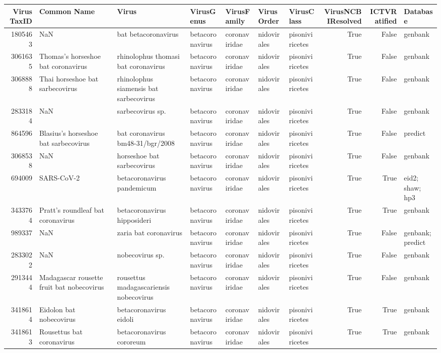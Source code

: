 \begin{tabular}{rllllllrrl}
\toprule
VirusTaxID & Common Name & Virus & VirusGenus & VirusFamily & VirusOrder & VirusClass & VirusNCBIResolved & ICTVRatified & Database \\
\midrule
1805463 & NaN & bat betacoronavirus & betacoronavirus & coronaviridae & nidovirales & pisoniviricetes & True & False & genbank \\
3061635 & Thomas's horseshoe bat coronavirus & rhinolophus thomasi bat coronavirus & betacoronavirus & coronaviridae & nidovirales & pisoniviricetes & True & False & genbank \\
3068888 & Thai horseshoe bat sarbecovirus & rhinolophus siamensis bat sarbecovirus & betacoronavirus & coronaviridae & nidovirales & pisoniviricetes & True & False & genbank \\
2833184 & NaN & sarbecovirus sp. & betacoronavirus & coronaviridae & nidovirales & pisoniviricetes & True & False & genbank \\
864596 & Blasius's horseshoe bat sarbecovirus & bat coronavirus bm48-31/bgr/2008 & betacoronavirus & coronaviridae & nidovirales & pisoniviricetes & True & False & predict \\
3068538 & NaN & horseshoe bat sarbecovirus & betacoronavirus & coronaviridae & nidovirales & pisoniviricetes & True & False & genbank \\
694009 & SARS-CoV-2 & betacoronavirus pandemicum & betacoronavirus & coronaviridae & nidovirales & pisoniviricetes & True & True & eid2; shaw; hp3 \\
3433764 & Pratt's roundleaf bat coronavirus & betacoronavirus hipposideri & betacoronavirus & coronaviridae & nidovirales & pisoniviricetes & True & True & genbank \\
989337 & NaN & zaria bat coronavirus & betacoronavirus & coronaviridae & nidovirales & pisoniviricetes & True & False & genbank; predict \\
2833022 & NaN & nobecovirus sp. & betacoronavirus & coronaviridae & nidovirales & pisoniviricetes & True & False & genbank \\
2913444 & Madagascar rousette fruit bat nobecovirus & rousettus madagascariensis nobecovirus & betacoronavirus & coronaviridae & nidovirales & pisoniviricetes & True & False & genbank \\
3418614 & Eidolon bat nobecovirus & betacoronavirus eidoli & betacoronavirus & coronaviridae & nidovirales & pisoniviricetes & True & True & genbank \\
3418613 & Rousettus bat coronavirus & betacoronavirus cororeum & betacoronavirus & coronaviridae & nidovirales & pisoniviricetes & True & True & genbank \\

\end{tabular}
